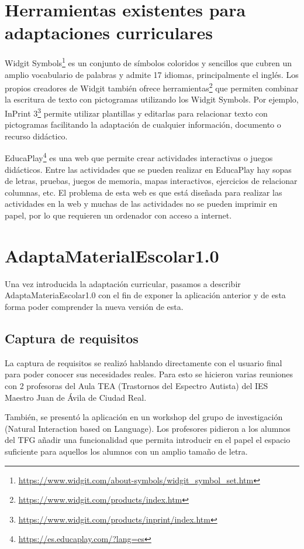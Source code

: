 \section{Herramientas existentes para adaptaciones curriculares}
Widgit Symbols\footnote{\url{https://www.widgit.com/about-symbols/widgit_symbol_set.htm}} es un conjunto de símbolos coloridos y sencillos que cubren un amplio vocabulario de palabras y admite 17 idiomas, principalmente el inglés. Los propios creadores de Widgit también ofrece herramientas\footnote{\url{https://www.widgit.com/products/index.htm}} que permiten combinar la escritura de texto con pictogramas utilizando los Widgit Symbols. Por ejemplo, InPrint 3\footnote{\url{https://www.widgit.com/products/inprint/index.htm}} permite utilizar plantillas y editarlas para relacionar texto con pictogramas facilitando la adaptación de cualquier información, documento o recurso didáctico.

EducaPlay\footnote{\url{https://es.educaplay.com/?lang=es}} es una web que permite crear actividades interactivas o juegos didácticos. Entre las actividades que se pueden realizar en EducaPlay hay sopas de letras, pruebas, juegos de memoria, mapas interactivos, ejercicios de relacionar columnas, etc. El problema de esta web es que está diseñada para realizar las actividades en la web y muchas de las actividades no se pueden imprimir en papel, por lo que requieren un ordenador con acceso a internet. 

\section{AdaptaMaterialEscolar1.0}

Una vez introducida la adaptación curricular, pasamos a describir AdaptaMateriaEscolar1.0 con el fin de exponer la aplicación anterior y de esta forma poder comprender la nueva versión de esta. 


\subsection{Captura de requisitos}
La captura de requisitos se realizó hablando directamente con el usuario final para poder conocer sus necesidades reales. Para esto se hicieron varias reuniones con 2 profesoras del Aula TEA (Trastornos del Espectro Autista) del IES Maestro Juan de Ávila de Ciudad Real.

También, se presentó la aplicación en un workshop del grupo de investigación (Natural Interaction based on Language). Los profesores pidieron a los alumnos del TFG añadir una funcionalidad que permita introducir en el papel el espacio suficiente para aquellos los alumnos con un amplio tamaño de letra.

